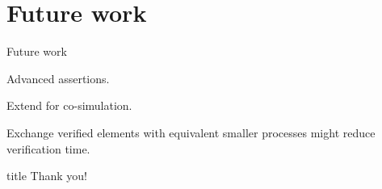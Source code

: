 \documentclass[11pt]{beamer}
\begin{document}
\section{Future work}
%
\begin{frame}{Future work}

\begin{block}{}
Advanced assertions.
\end{block}

\pause

\begin{block}{}
Extend for co-simulation.
\end{block}

\pause

\begin{block}{}
Exchange verified elements with equivalent smaller processes might reduce verification time.
\end{block}


\end{frame}

%
  \begin{frame}
  \vfill
  \centering
  \begin{beamercolorbox}[sep=8pt,center,shadow=true,rounded=true]{title}
    Thank you!\par%
  \end{beamercolorbox}
  \vfill
  \end{frame}
\end{document}

